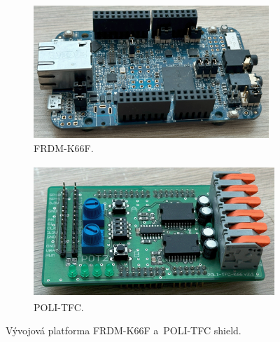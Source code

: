 \begin{figure}[h]
    \begin{subfigure}{0.45\textwidth}
        \includegraphics[width=\textwidth, height = 5cm]{Figures/FRDM-K66F.png} 
        \caption{FRDM-K66F.}
        \label{fig:FRDM-K66F}
    \end{subfigure}
    \hfill
    \begin{subfigure}{0.45\textwidth}
    	\includegraphics[width=\textwidth, height = 5cm]{Figures/POLI-TFC.png}
    	\caption{POLI-TFC.}
    	\label{fig:POLI-TFC}
	\end{subfigure}
    \caption{Vývojová platforma FRDM-K66F a~POLI-TFC shield.}
\end{figure}

\endinput